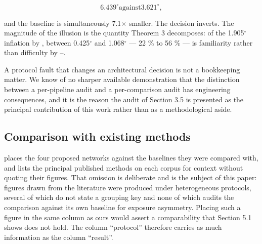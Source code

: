 \begin{equation}
\label{eq:302}
6.439^{\circ} \mathrm{against} 3.621^{\circ} ,
\end{equation}

and the baseline is simultaneously 7.1$\times$ smaller. The decision inverts. The magnitude of the illusion is the quantity Theorem 3 decomposes: of the 1.905$^{\circ}$ inflation by , between 0.425$^{\circ}$ and 1.068$^{\circ}$ --- 22 \% to 56 \% --- is familiarity rather than difficulty by --.

A protocol fault that changes an architectural decision is not a bookkeeping matter. We know of no sharper available demonstration that the distinction between a per-pipeline audit and a per-comparison audit has engineering consequences, and it is the reason the audit of Section 3.5 is presented as the principal contribution of this work rather than as a methodological aside.

\FloatBarrier

\subsection{Comparison with existing methods}

 places the four proposed networks against the baselines they were compared with, and lists the principal published methods on each corpus for context without quoting their figures. That omission is deliberate and is the subject of this paper: figures drawn from the literature were produced under heterogeneous protocols, several of which do not state a grouping key and none of which audits the comparison against its own baseline for exposure asymmetry. Placing such a figure in the same column as ours would assert a comparability that Section 5.1 shows does not hold. The column ``protocol'' therefore carries as much information as the column ``result''.

